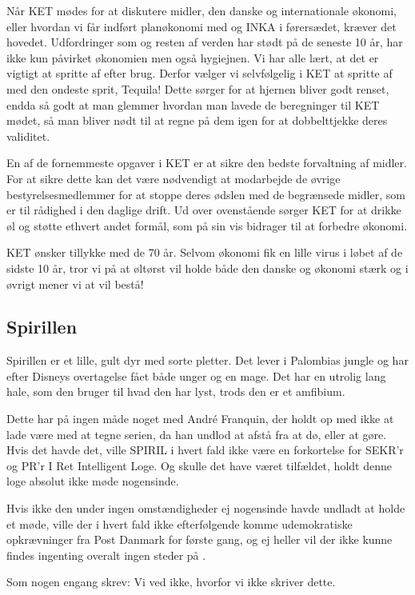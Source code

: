 Når KET mødes for at diskutere \TKETs midler, den danske og internationale økonomi, eller hvordan vi får indført planøkonomi med \KASS og INKA i førersædet, kræver det hovedet. Udfordringer som \TKET og resten af verden har stødt på de seneste 10 år, har ikke kun påvirket økonomien men også hygiejnen. Vi har alle lært, at det er vigtigt at spritte af efter brug. Derfor vælger vi selvfølgelig i KET at spritte af med den ondeste sprit, Tequila! Dette sørger for at hjernen bliver godt renset, endda så godt at man glemmer hvordan man lavede de beregninger til KET mødet, så man bliver nødt til at regne på dem igen for at dobbelttjekke deres validitet.

En af de fornemmeste opgaver i KET er at sikre den bedste forvaltning af \TKETs midler. For at sikre dette kan det være nødvendigt at modarbejde de øvrige bestyrelsesmedlemmer for at stoppe deres ødslen med de begrænsede midler, som er til rådighed i den daglige drift. 
Ud over ovenstående sørger KET for at drikke øl og støtte ethvert andet formål, som på sin vis bidrager til at forbedre \TKETs økonomi.

KET ønsker \TKET tillykke med de 70 år. Selvom \TKETs økonomi fik en lille virus i løbet af de sidste 10 år, tror vi på at \TKETs øltørst vil holde både den danske og \TKETs økonomi stærk og i øvrigt mener vi at \TKET vil bestå!

\subsection{Spirillen}
Spirillen er et lille, gult dyr med sorte pletter. Det lever i Palombias jungle og har efter Disneys overtagelse fået både unger og en mage. Det har en utrolig lang hale, som den bruger til hvad den har lyst, trods den er et amfibium.

Dette har på ingen måde noget med André Franquin, der holdt op med ikke at lade være med at tegne serien, da han undlod at afstå fra at dø, eller \TKET at gøre. Hvis det havde det, ville SPIRIL i hvert fald ikke være en forkortelse for SEKR'r og PR'r I Ret Intelligent Loge. Og skulle det have været tilfældet, holdt denne loge absolut ikke møde nogensinde.

Hvis ikke den under ingen omstændigheder ej nogensinde havde undladt at holde et møde, ville der i hvert fald ikke efterfølgende komme udemokratiske opkrævninger fra Post Danmark for første gang, og ej heller vil der ikke kunne findes ingenting overalt ingen steder på \TKET. 

Som nogen engang skrev: Vi ved ikke, hvorfor vi ikke skriver dette.

